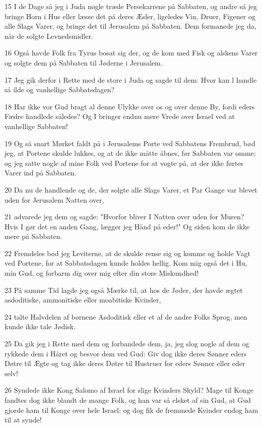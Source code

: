 \par 15 I de Dage så jeg i Juda nogle træde Persekarrene på Sabbaten, og andre så jeg bringe Horn i Hus eller læsse det på deres Æsler, ligeledes Vin, Druer, Figener og alle Slags Varer, og bringe det til Jerusalem på Sabbaten. Dem formanede jeg da, når de solgte Levnedsmidler.
\par 16 Også havde Folk fra Tyrus bosat sig der, og de kom med Fisk og alskens Varer og solgte dem på Sabbaten til Jøderne i Jerusalem.
\par 17 Jeg gik derfor i Rette med de store i Juda og sagde til dem: Hvor kan l handle så ilde og vanhellige Sabbatsdagen?
\par 18 Har ikke vor Gud bragt al denne Ulykke over os og over denne By, fordi eders Fædre handlede således? Og I bringer endnu mere Vrede over Israel ved at vanhellige Sabbaten!
\par 19 Og så snart Mørket faldt på i Jerusalems Porte ved Sabbatens Frembrud, bød jeg, at Portene skulde lukkes, og at de ikke måtte åbnes, før Sabbaten var omme; og jeg satte nogle af mine Folk ved Portene for at vogte på, at der ikke førtes Varer ind på Sabbaten.
\par 20 Da nu de handlende og de, der solgte alle Slags Varer, et Par Gange var blevet uden for Jerusalem Natten over,
\par 21 advarede jeg dem og sagde: "Hvorfor bliver I Natten over uden for Muren? Hvis I gør det en anden Gang, lægger jeg Hånd på eder!" Og siden kom de ikke mere på Sabbaten.
\par 22 Fremdeles bød jeg Leviterne, at de skulde rense sig og komme og holde Vagt ved Portene, for at Sabbatsdagen kunde holdes hellig. Kom mig også det i Hu, min Gud, og forbarm dig over mig efter din store Miskundhed!
\par 23 På samme Tid lagde jeg også Mærke til, at hos de Jøder, der havde ægtet asdoditiske, ammonitiske eller moabitiske Kvinder,
\par 24 talte Halvdelen af børnene Asdoditisk eller et af de andre Folks Sprog, men kunde ikke tale Jødisk.
\par 25 Da gik jeg i Rette med dem og forbandede dem, ja, jeg slog nogle af dem og rykkede dem i Håret og besvor dem ved Gud: Giv dog ikke deres Sønner eders Døtre til Ægte og tag ikke deres Døtre til Hustruer for eders Sønner eller eder selv!
\par 26 Syndede ikke Kong Salomo af Israel for slige Kvinders Skyld? Mage til Konge fandtes dog ikke blandt de mange Folk, og han var så elsket af sin Gud, at Gud gjorde ham til Konge over hele Israel; og dog fik de fremmede Kvinder endog ham til at synde!
